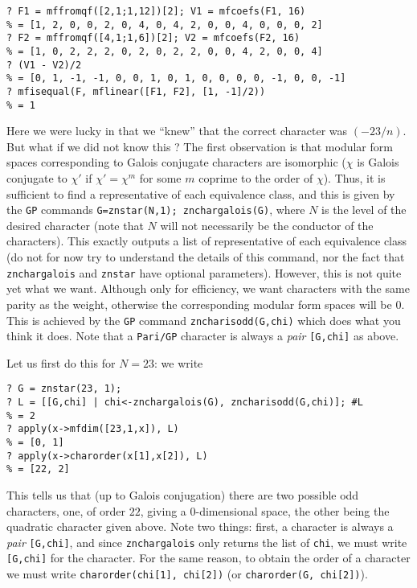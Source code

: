 \documentclass[11pt]{article}
\def\kbd#1{{\tt #1}}
\begin{document}
\begin{verbatim}
? F1 = mffromqf([2,1;1,12])[2]; V1 = mfcoefs(F1, 16)
% = [1, 2, 0, 0, 2, 0, 4, 0, 4, 2, 0, 0, 4, 0, 0, 0, 2]
? F2 = mffromqf([4,1;1,6])[2]; V2 = mfcoefs(F2, 16)
% = [1, 0, 2, 2, 2, 0, 2, 0, 2, 2, 0, 0, 4, 2, 0, 0, 4]
? (V1 - V2)/2
% = [0, 1, -1, -1, 0, 0, 1, 0, 1, 0, 0, 0, 0, -1, 0, 0, -1]
? mfisequal(F, mflinear([F1, F2], [1, -1]/2))
% = 1
\end{verbatim}

Here we were lucky in that we ``knew'' that the correct character was
$(-23/n)$. But what if we did not know this ? The first observation is
that modular form spaces corresponding to Galois conjugate characters
are isomorphic ($\chi$ is Galois conjugate to $\chi'$ if $\chi'=\chi^m$
for some $m$ coprime to the order of $\chi$). Thus, it is sufficient
to find a representative of each equivalence class, and this is given by
the \kbd{GP} commands \kbd{G=znstar(N,1); znchargalois(G)}, where $N$ is the
level of the desired character (note that $N$ will not necessarily be
the conductor of the characters). This exactly outputs a list of representative
of each equivalence class (do not for now try to understand the details of
this command, nor the fact that \kbd{znchargalois} and \kbd{znstar} have
optional parameters). However, this is not quite yet what we want.
Although only for efficiency, we want characters with the same parity
as the weight, otherwise the corresponding modular form spaces will be $0$.
This is achieved by the \kbd{GP} command \kbd{zncharisodd(G,chi)} which
does what you think it does. Note that a \kbd{Pari/GP} character is always
a \emph{pair} \kbd{[G,chi]} as above.

Let us first do this for $N=23$: we write

\begin{verbatim}
? G = znstar(23, 1);
? L = [[G,chi] | chi<-znchargalois(G), zncharisodd(G,chi)]; #L
% = 2
? apply(x->mfdim([23,1,x]), L)
% = [0, 1]
? apply(x->charorder(x[1],x[2]), L)
% = [22, 2]
\end{verbatim}

This tells us that (up to Galois conjugation) there are two possible odd
characters, one, of order $22$, giving a $0$-dimensional space, the other
being the quadratic character given above. Note two things: first, a character
is always a \emph{pair} \kbd{[G,chi]}, and since \kbd{znchargalois} only
returns the list of \kbd{chi}, we must write \kbd{[G,chi]} for the character.
For the same reason, to obtain the order of a character we must write
\kbd{charorder(chi[1], chi[2])} (or \kbd{charorder(G, chi[2])}).
\end{document}
